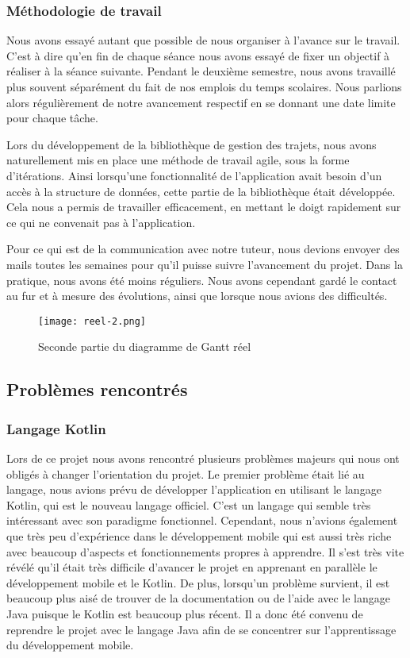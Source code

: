 \subsubsection{Méthodologie de travail}
Nous avons essayé autant que possible de nous organiser à l'avance sur le travail. C'est à dire qu'en fin de chaque séance nous avons essayé de fixer un objectif à réaliser à la séance suivante.
Pendant le deuxième semestre, nous avons travaillé plus souvent séparément du fait de nos emplois du temps scolaires. Nous parlions alors régulièrement de notre avancement respectif en se donnant une date limite pour chaque tâche.
\par
Lors du développement de la bibliothèque de gestion des trajets, nous avons naturellement mis en place une méthode de travail agile, sous la forme d'itérations. Ainsi lorsqu'une fonctionnalité de l'application avait besoin d'un accès à la structure de données, cette partie de la bibliothèque était développée.
Cela nous a permis de travailler efficacement, en mettant le doigt rapidement sur ce qui ne convenait pas à l'application.
\par
Pour ce qui est de la communication avec notre tuteur, nous devions envoyer des mails toutes les semaines pour qu'il puisse suivre l'avancement du projet. Dans la pratique, nous avons été moins réguliers. Nous avons cependant gardé le contact au fur et à mesure des évolutions, ainsi que lorsque nous avions des difficultés.
\vfill
\begin{figure}[!h]
    \begin{center}
        \texttt{[image: reel-2.png]}
        \caption{Seconde partie du diagramme de Gantt réel}
    \end{center}
\end{figure}
\newpage




\subsection{Problèmes rencontrés}
\subsubsection{Langage Kotlin}
Lors de ce projet nous avons rencontré plusieurs problèmes majeurs qui nous ont obligés à changer l'orientation du projet.
Le premier problème était lié au langage, nous avions prévu de développer l'application en utilisant le langage Kotlin, qui est le nouveau langage officiel.
C'est un langage qui semble très intéressant avec son paradigme fonctionnel. Cependant, nous n'avions également que très peu d'expérience
dans le développement mobile qui est aussi très riche avec beaucoup d'aspects et fonctionnements propres à apprendre. Il s'est très vite révélé
qu'il était très difficile d'avancer le projet en apprenant en parallèle le développement mobile et le Kotlin. De plus, lorsqu'un problème
survient, il est beaucoup plus aisé de trouver de la documentation ou de l'aide avec le langage Java puisque le Kotlin est beaucoup plus récent.
Il a donc été convenu de reprendre le projet avec le langage Java afin de se concentrer sur l'apprentissage du développement mobile.
